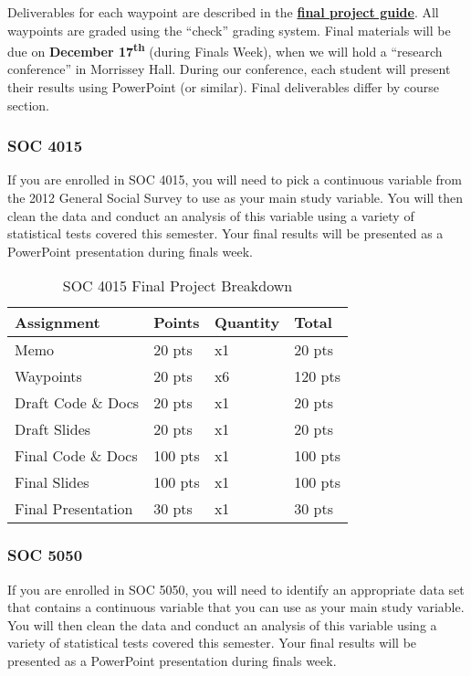 \documentclass[]{book}
\theoremstyle{definition}
\theoremstyle{definition}
\theoremstyle{definition}
\theoremstyle{remark}
\begin{document}
Deliverables for each waypoint are described in the
\href{https://slu-soc5050.github.io/finalGuide}{\textbf{final project
guide}}. All waypoints are graded using the ``check'' grading system.
Final materials will be due on \textbf{December 17\textsuperscript{th}}
(during Finals Week), when we will hold a ``research conference'' in
Morrissey Hall. During our conference, each student will present their
results using PowerPoint (or similar). Final deliverables differ by
course section.

\hypertarget{soc-4015}{%
\subsubsection{SOC 4015}\label{soc-4015}}

If you are enrolled in SOC 4015, you will need to pick a continuous
variable from the 2012 General Social Survey to use as your main study
variable. You will then clean the data and conduct an analysis of this
variable using a variety of statistical tests covered this semester.
Your final results will be presented as a PowerPoint presentation during
finals week.

\begin{table}

\caption{\label{tab:unnamed-chunk-6}SOC 4015 Final Project Breakdown}
\centering
\begin{tabular}[t]{llll}
\toprule
Assignment & Points & Quantity & Total\\
\midrule
Memo & 20 pts & x1 & 20 pts\\
Waypoints & 20 pts & x6 & 120 pts\\
Draft Code \& Docs & 20 pts & x1 & 20 pts\\
Draft Slides & 20 pts & x1 & 20 pts\\
Final Code \& Docs & 100 pts & x1 & 100 pts\\
\addlinespace
Final Slides & 100 pts & x1 & 100 pts\\
Final Presentation & 30 pts & x1 & 30 pts\\
\bottomrule
\end{tabular}
\end{table}

\hypertarget{soc-5050}{%
\subsubsection{SOC 5050}\label{soc-5050}}

If you are enrolled in SOC 5050, you will need to identify an
appropriate data set that contains a continuous variable that you can
use as your main study variable. You will then clean the data and
conduct an analysis of this variable using a variety of statistical
tests covered this semester. Your final results will be presented as a
PowerPoint presentation during finals week.
\end{document}
